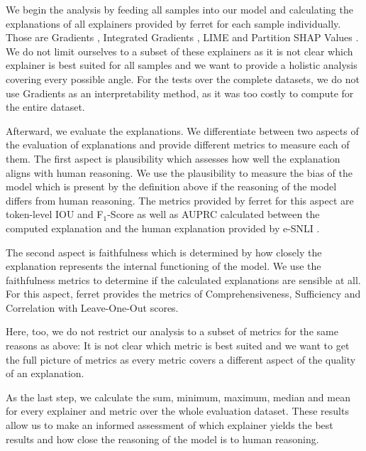 We begin the analysis by feeding all samples into our model and calculating the explanations of all explainers provided by ferret \cite{ferret} for each sample individually. Those are Gradients \cite{gradients}, Integrated Gradients \cite{integratedgradients}, \ac{LIME} \cite{lime} and Partition SHAP Values \cite{shap}. We do not limit ourselves to a subset of these explainers as it is not clear which explainer is best suited for all samples and we want to provide a holistic analysis covering every possible angle. For the tests over the complete datasets, we do not use Gradients as an interpretability method, as it was too costly to compute for the entire dataset.

Afterward, we evaluate the explanations. We differentiate between two aspects of the evaluation of explanations and provide different metrics to measure each of them. The first aspect is plausibility which assesses how well the explanation aligns with human reasoning. We use the plausibility to measure the bias of the model which is present by the definition above if the reasoning of the model differs from human reasoning. The metrics provided by ferret for this aspect are token-level \ac{IOU} and F$_1$-Score as well as \ac{AUPRC} calculated between the computed explanation and the human explanation provided by \ac{e-SNLI} \cite{ferret}. 

The second aspect is faithfulness which is determined by how closely the explanation represents the internal functioning of the model. We use the faithfulness metrics to determine if the calculated explanations are sensible at all. For this aspect, ferret provides the metrics of Comprehensiveness, Sufficiency and Correlation with Leave-One-Out scores.

Here, too, we do not restrict our analysis to a subset of metrics for the same reasons as above: It is not clear which metric is best suited and we want to get the full picture of metrics as every metric covers a different aspect of the quality of an explanation.

As the last step, we calculate the sum, minimum, maximum, median and mean for every explainer and metric over the whole evaluation dataset. These results allow us to make an informed assessment of which explainer yields the best results and how close the reasoning of the model is to human reasoning.